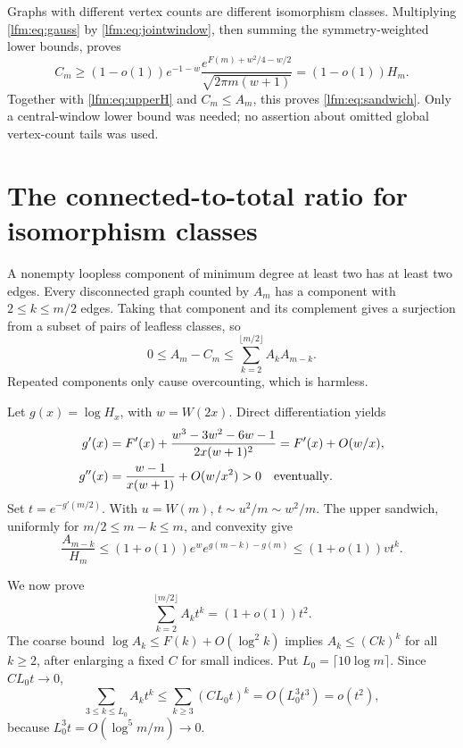 \documentclass[11pt,letterpaper]{article}
\theoremstyle{remark}\newtheorem{remark}[theorem]{Remark}
\begin{document}
Graphs with different vertex counts are different isomorphism classes. Multiplying \eqref{lfm:eq:gauss} by \eqref{lfm:eq:jointwindow}, then summing the symmetry-weighted lower bounds, proves
\[
 C_m\ge(1-o(1))e^{-1-w}
 \frac{e^{F(m)+w^2/4-w/2}}{\sqrt{2\pi m(w+1)}}
 =(1-o(1))H_m.
\]
Together with \eqref{lfm:eq:upperH} and $C_m\le A_m$, this proves \eqref{lfm:eq:sandwich}. Only a central-window lower bound was needed; no assertion about omitted global vertex-count tails was used.

\section{The connected-to-total ratio for isomorphism classes}\label{lfm:sec:ratio}
A nonempty loopless component of minimum degree at least two has at least two edges. Every disconnected graph counted by $A_m$ has a component with $2\le k\le m/2$ edges. Taking that component and its complement gives a surjection from a subset of pairs of leafless classes, so
\begin{equation}
 0\le A_m-C_m\le\sum_{k=2}^{\lfloor m/2\rfloor}A_kA_{m-k}.\label{lfm:eq:convolution}
\end{equation}
Repeated components only cause overcounting, which is harmless.

Let $g(x)=\log H_x$, with $w=W(2x)$. Direct differentiation yields
\begin{align}
 g'(x)&=F'(x)+\frac{w^3-3w^2-6w-1}{2x(w+1)^2}
       =F'(x)+O(w/x),\label{lfm:eq:gprime}\\
 g''(x)&=\frac{w-1}{x(w+1)}+O(w/x^2)>0
 \quad\hbox{eventually}.\label{lfm:eq:gsecond}
\end{align}
Set $t=e^{-g'(m/2)}$. With $u=W(m)$, $t\sim u^2/m\sim w^2/m$. The upper sandwich, uniformly for $m/2\le m-k\le m$, and convexity give
\begin{equation}
 \frac{A_{m-k}}{H_m}
 \le(1+o(1))e^w e^{g(m-k)-g(m)}
 \le(1+o(1))v t^k.\label{lfm:eq:ratio-middle}
\end{equation}

We now prove
\begin{equation}
 \sum_{k=2}^{\lfloor m/2\rfloor}A_kt^k=(1+o(1))t^2.\label{lfm:eq:small-series}
\end{equation}
The coarse bound $\log A_k\le F(k)+O(\log^2k)$ implies $A_k\le(Ck)^k$ for all $k\ge2$, after enlarging a fixed $C$ for small indices. Put $L_0=\lceil10\log m\rceil$. Since $CL_0t\to0$,
\[
 \sum_{3\le k\le L_0}A_kt^k
 \le\sum_{k\ge3}(CL_0t)^k
 =O(L_0^3t^3)=o(t^2),
\]
because $L_0^3t=O(\log^5m/m)\to0$.
\end{document}
